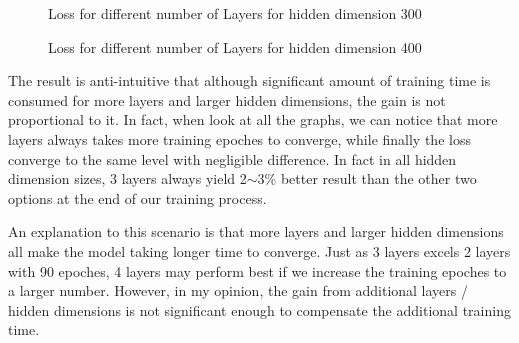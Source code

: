 \documentclass{article}
\begin{document}
\begin{figure}
\centering
{}
\caption{Loss for different number of Layers for hidden dimension 300}
\label{tab:hd300loss}
\end{figure}

\begin{figure}
\centering
{}
\caption{Loss for different number of Layers for hidden dimension 400}
\label{tab:hd400loss}
\end{figure}
 
The result is anti-intuitive that although significant amount of training time
is consumed for more layers and larger hidden dimensions, the gain is not
proportional to it. In fact, when look at all the graphs, we can notice that
more layers always takes more training epoches to converge, while finally
the loss converge to the same level with negligible difference. In fact in all
hidden dimension sizes, 3 layers always yield 2$\sim$3\% better result than the
other two options at the end of our training process. 

An explanation to this scenario is that more layers and larger hidden
dimensions all make the model taking longer time to converge. Just as 3 layers
excels 2 layers with 90 epoches, 4 layers may perform best if we increase the
training epoches to a larger number. However, in my opinion, the gain from
additional layers / hidden dimensions is not significant enough to compensate
the additional training time.
\end{document}
